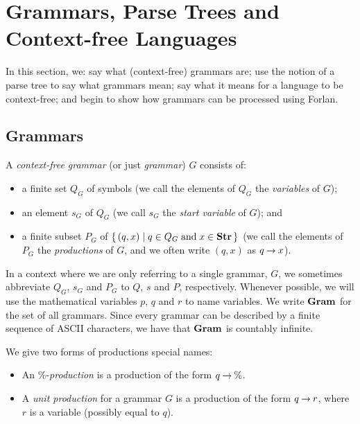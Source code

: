 \section{Grammars, Parse Trees and Context-free Languages}
\label{GrammarsParseTreesAndContextFreeLanguages}


In this section, we: say what (context-free) grammars are; use the
notion of a parse tree to say what grammars mean; say what it means
for a language to be context-free; and begin to show how grammars can
be processed using Forlan.

\subsection{Grammars}

A \emph{context-free grammar} (or just \emph{grammar}) $G$ consists of:
\begin{itemize}
\item a finite set $Q_G$ of symbols (we call the elements of $Q_G$
the \emph{variables} of $G$);

\item an element $s_G$ of $Q_G$ (we call $s_G$ the \emph{start variable}
of $G$); and

\item a finite subset $P_G$ of $\{ \, (q,x) \mid q\in Q_G\;\allowbreak\mbox{and}\allowbreak\;
x\in\mathbf{Str} \, \}$ (we call the elements of $P_G$ the \emph{productions} of
$G$, and we often write $(q, x)$ as $q\mathbin{\to} x$).
\end{itemize}
%
%
%

In a context where we are only referring to a single grammar, $G$, we
sometimes abbreviate $Q_G$, $s_G$ and $P_G$ to $Q$, $s$ and $P$,
respectively.  Whenever possible, we will use the mathematical
variables $p$, $q$ and $r$ to name variables.  We write $\mathbf{Gram}$ for
%
%
the set of all grammars.  Since every grammar can be described by a
finite sequence of ASCII characters, we have that $\mathbf{Gram}$ is countably
infinite.

We give two forms of productions special names:
\begin{itemize}
\item An $\%$-\emph{production} is a production of the form $q\mathbin{\to}\%$.

\item A \emph{unit production} for a grammar $G$ is a production of
  the form $q\mathbin{\to} r$, where $r$ is a variable (possibly equal to $q$).
\end{itemize}

